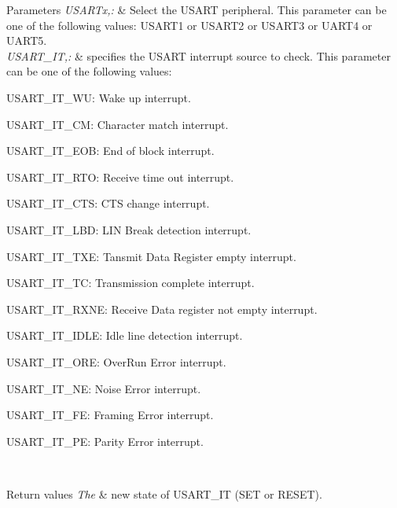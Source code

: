 \begin{DoxyParams}{Parameters}
{\em U\-S\-A\-R\-Tx,\-:} & Select the U\-S\-A\-R\-T peripheral. This parameter can be one of the following values\-: U\-S\-A\-R\-T1 or U\-S\-A\-R\-T2 or U\-S\-A\-R\-T3 or U\-A\-R\-T4 or U\-A\-R\-T5. \\
\hline
{\em U\-S\-A\-R\-T\-\_\-\-I\-T,\-:} & specifies the U\-S\-A\-R\-T interrupt source to check. This parameter can be one of the following values\-: \begin{DoxyItemize}
\item U\-S\-A\-R\-T\-\_\-\-I\-T\-\_\-\-W\-U\-: Wake up interrupt. \item U\-S\-A\-R\-T\-\_\-\-I\-T\-\_\-\-C\-M\-: Character match interrupt. \item U\-S\-A\-R\-T\-\_\-\-I\-T\-\_\-\-E\-O\-B\-: End of block interrupt. \item U\-S\-A\-R\-T\-\_\-\-I\-T\-\_\-\-R\-T\-O\-: Receive time out interrupt. \item U\-S\-A\-R\-T\-\_\-\-I\-T\-\_\-\-C\-T\-S\-: C\-T\-S change interrupt. \item U\-S\-A\-R\-T\-\_\-\-I\-T\-\_\-\-L\-B\-D\-: L\-I\-N Break detection interrupt. \item U\-S\-A\-R\-T\-\_\-\-I\-T\-\_\-\-T\-X\-E\-: Tansmit Data Register empty interrupt. \item U\-S\-A\-R\-T\-\_\-\-I\-T\-\_\-\-T\-C\-: Transmission complete interrupt. \item U\-S\-A\-R\-T\-\_\-\-I\-T\-\_\-\-R\-X\-N\-E\-: Receive Data register not empty interrupt. \item U\-S\-A\-R\-T\-\_\-\-I\-T\-\_\-\-I\-D\-L\-E\-: Idle line detection interrupt. \item U\-S\-A\-R\-T\-\_\-\-I\-T\-\_\-\-O\-R\-E\-: Over\-Run Error interrupt. \item U\-S\-A\-R\-T\-\_\-\-I\-T\-\_\-\-N\-E\-: Noise Error interrupt. \item U\-S\-A\-R\-T\-\_\-\-I\-T\-\_\-\-F\-E\-: Framing Error interrupt. \item U\-S\-A\-R\-T\-\_\-\-I\-T\-\_\-\-P\-E\-: Parity Error interrupt. \end{DoxyItemize}
\\
\hline
\end{DoxyParams}

\begin{DoxyRetVals}{Return values}
{\em The} & new state of U\-S\-A\-R\-T\-\_\-\-I\-T (S\-E\-T or R\-E\-S\-E\-T). \\
\hline
\end{DoxyRetVals}


